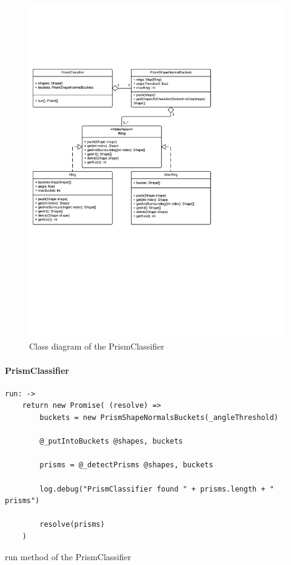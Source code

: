 \documentclass[../ClassicThesis.tex]{subfiles}
\begin{document}
\begin{figure}
\includegraphics[width=1.0\columnwidth]{Images/04-prismClassifier.png}
\caption{Class diagram of the PrismClassifier}
\label{fig:prismClassifierDiagram}
\end{figure}

\paragraph{PrismClassifier}

\begin{listing}[!h]
\centering
\begin{verbatim}
run: ->
    return new Promise( (resolve) =>
        buckets = new PrismShapeNormalsBuckets(_angleThreshold)

        @_putIntoBuckets @shapes, buckets

        prisms = @_detectPrisms @shapes, buckets

        log.debug("PrismClassifier found " + prisms.length + " prisms")

        resolve(prisms)
    )
\end{verbatim}
\caption{run method of the PrismClassifier}
\label{lst:PrismClassifierRun}
\end{listing}
\end{document}
